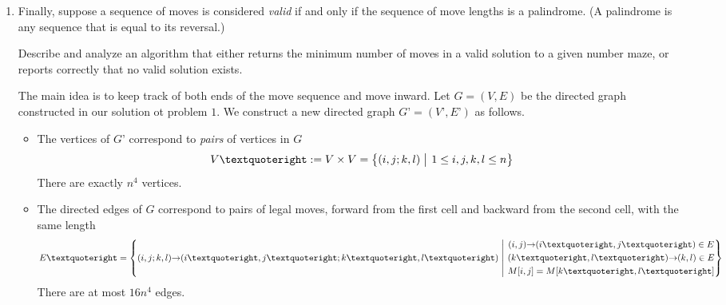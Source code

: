 \documentclass[11pt]{article}
\begin{document}
\begin{enumerate}
\begin{Solution}
\begin{itemize}
\item
The vertices and edges do not have associated values.

\item
Any sequence of legal moves in number maze $M$ corresponds to a directed path in graph $G$, and vice versa.  In particular, the shortest sequence of legal moves from the upper left corner to the lower right corner corresponds to the shortest path in $G$ from the start vertex $(1,1,0)$ to any vertex of the form $(n,n,\ell)$.

\item
We can compute shortest paths from $(1,1,0)$ to every vertex in $V$ using breadth-first search, after which we can find the shortest shortest path to $(n,n,\cdot)$ by brute force.

\item
Our algorithm runs in $O(V+E) =$ .

\end{itemize}
This graph $G$ is a \emph{subgraph} of the standard product construction between the basic number-maze graph, described in our solution to problem 1, and a complete directed acyclic graph with $n$ vertices.
\end{Solution}


\newpage
\item
Finally, suppose a sequence of moves is considered \emph{valid} if and only if the sequence of move lengths is a palindrome.  (A palindrome is any sequence that is equal to its reversal.)

Describe and analyze an algorithm that either returns the minimum number of moves in a valid solution to a given number maze, or reports correctly that no valid solution exists.

\begin{Solution}
The main idea is to keep track of both ends of the move sequence and move inward.  Let $G=(V,E)$ be the directed graph constructed in our solution ot problem $1$.  We construct a new directed graph $G’=(V’,E’)$ as follows.
\begin{itemize}
\item
The vertices of $G’$ correspond to \emph{pairs} of vertices in $G$
\[
	V’ := V\times V = \Setbar{(i,j;k,l)\strut}{1\le i,j,k,l \le n}
\]
There are exactly $n^4$ vertices.

\item
The directed edges of $G$ correspond to pairs of legal moves, forward from the first cell and backward from the second cell, with the same length
\[
	E’ = \Setbar{(i,j;k,l)\arcto (i’,j’;k’,l’)\strut}
				{\begin{gathered}
					(i,j)\arcto(i’,j’)\in E \\
				 	(k’,l’)\arcto(k,l)\in E \\
					M[i,j] = M[k’,l’]
				\end{gathered}}
\]
There are at most $16n^4$ edges.


\end{itemize}
\end{Solution}
\end{enumerate}
\end{document}
